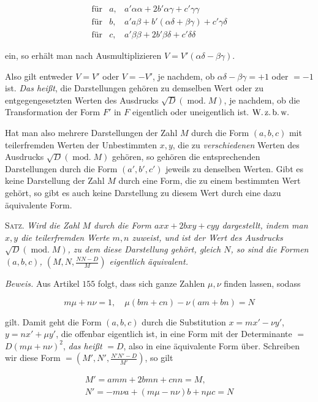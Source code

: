 \[
\begin{array}{lll}\text{für}&a,&a'\alpha\alpha+2b'\alpha\gamma+c'\gamma\gamma\\\text{für}&b,&a'a\beta+b'(\alpha\delta+\beta\gamma)+c'\gamma\delta\\\text{für}&c,&a'\beta\beta+2b'\beta\delta+c'\delta\delta\end{array}
\]

ein, so erhält man nach Ausmultiplizieren $V=V'(\alpha\delta-\beta\gamma).$

Also gilt entweder $V=V'$ oder $V=-V'$, je nachdem, ob $\alpha\delta-\beta\gamma=+1$ oder $=-1$ ist. \emph{Das heißt}, die Darstellungen gehören zu demselben Wert oder zu entgegengesetzten Werten des Ausdrucks $\surd D(\operatorname{mod.}M)$, je nachdem, ob die Transformation der Form $F'$ in $F$ eigentlich oder uneigentlich ist. $\text{W.\,z.\,b.\,w.}$

Hat man also mehrere Darstellungen der Zahl $M$ durch die Form $(a,b,c)$ mit teilerfremden Werten der Unbestimmten $x,y$, die zu \emph{verschiedenen} Werten des Ausdrucks $\surd D(\operatorname{mod.}M)$ gehören, so gehören die entsprechenden Darstellungen durch die Form $(a',b',c')$ jeweils zu denselben Werten. Gibt es keine Darstellung der Zahl $M$ durch eine Form, die zu einem bestimmten Wert gehört, so gibt es auch keine Darstellung zu diesem Wert durch eine dazu äquivalente Form.



\textsc{Satz.} \emph{Wird die Zahl $M$ durch die Form $axx+2bxy+cyy$ dargestellt, indem man $x,y$ die teilerfremden Werte $m,n$ zuweist, und ist der Wert des Ausdrucks $\surd D(\operatorname{mod.}M)$, zu dem diese Darstellung gehört, gleich $N$, so sind die Formen $(a,b,c)$, $(M,N,\frac{NN-D}{M})$ eigentlich äquivalent.}

\emph{Beweis.} Aus Artikel $155$ folgt, dass sich ganze Zahlen $\mu,\nu$ finden lassen, sodass

\[
m\mu+n\nu=1,\quad \mu(bm+cn)-\nu(am+bn)=N
\]

gilt. Damit geht die Form $(a,b,c)$ durch die Substitution $x=mx'-\nu y'$, $y=nx'+\mu y'$, die offenbar eigentlich ist, in eine Form mit der Determinante $=$ $D(m\mu+n\nu)^2$, \emph{das heißt} $=D$, also in eine äquivalente Form über. Schreiben wir diese Form $=(M',N',\frac{N'N'-D}{M'})$, so gilt

\[
\begin{gathered}M'=amm+2bmn+cnn=M,\\N'=-m\nu a+(m\mu-n\nu)b+n\mu c=N\end{gathered}
\]

